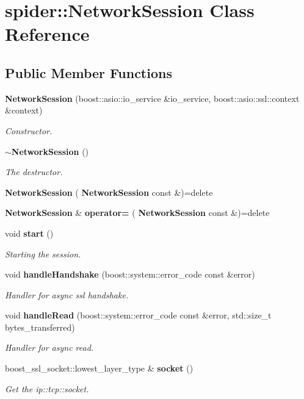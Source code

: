 \section{spider\+:\+:Network\+Session Class Reference}
\label{classspider_1_1_network_session}
\subsection*{Public Member Functions}
\begin{DoxyCompactItemize}
\item 
\textbf{ Network\+Session} (boost\+::asio\+::io\+\_\+service \&io\+\_\+service, boost\+::asio\+::ssl\+::context \&context)
\begin{DoxyCompactList}\small\item\em Constructor. \end{DoxyCompactList}\item 
\mbox{\label{classspider_1_1_network_session_ab5de365f6424a495036c9e812f0f4ad6}} 
\textbf{ $\sim$\+Network\+Session} ()
\begin{DoxyCompactList}\small\item\em The destructor. \end{DoxyCompactList}\item 
\mbox{\label{classspider_1_1_network_session_a3ed991568f236bd39ceb0b80f88b455e}} 
{\bfseries Network\+Session} (\textbf{ Network\+Session} const \&)=delete
\item 
\mbox{\label{classspider_1_1_network_session_afa533f49e902b6fb2a0317c882c5dba9}} 
\textbf{ Network\+Session} \& {\bfseries operator=} (\textbf{ Network\+Session} const \&)=delete
\item 
\mbox{\label{classspider_1_1_network_session_a7a4f39e7b5fe0b1784d8399f8299e861}} 
void \textbf{ start} ()
\begin{DoxyCompactList}\small\item\em Starting the session. \end{DoxyCompactList}\item 
void \textbf{ handle\+Handshake} (boost\+::system\+::error\+\_\+code const \&error)
\begin{DoxyCompactList}\small\item\em Handler for async ssl handshake. \end{DoxyCompactList}\item 
void \textbf{ handle\+Read} (boost\+::system\+::error\+\_\+code const \&error, std\+::size\+\_\+t bytes\+\_\+transferred)
\begin{DoxyCompactList}\small\item\em Handler for async read. \end{DoxyCompactList}\item 
boost\+\_\+ssl\+\_\+socket\+::lowest\+\_\+layer\+\_\+type \& \textbf{ socket} ()
\begin{DoxyCompactList}\small\item\em Get the ip\+::tcp\+::socket. \end{DoxyCompactList}\end{DoxyCompactItemize}


